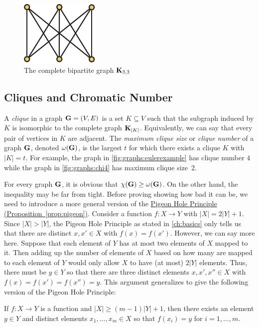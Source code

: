 \begin{figure}[h]
  \centering
  \includegraphics{graphs-figs/k33_rotated}
  \caption{The complete bipartite graph $\mathbf{K}_{3,3}$}
  \label{fig:graphs:k33}
\end{figure}

\subsection{Cliques and Chromatic Number}

A \textit{clique} in a graph $\mathbf{G}=(V,E)$ is a set $K\subseteq V$ such that
the subgraph induced by $K$ is isomorphic to the complete graph
$\mathbf{K}_{|K|}$. Equivalently, we can say that every pair of vertices in
$K$ are adjacent. The \textit{maximum clique size} or \textit{clique
  number} of a graph $\mathbf{G}$, denoted $\omega(\mathbf{G})$, is the largest
$t$ for which there exists a clique $K$ with $|K|=t$.  For example,
the graph in \autoref{fig:graphs:eulerexample} has clique number $4$
while the graph in \autoref{fig:graphs:chi4} has maximum clique
size~$2$.

For every graph $\mathbf{G}$, it is obvious that $\chi(\mathbf{G})\ge
\omega(\mathbf{G})$.  On the other hand, the inequality may be far from
tight. Before proving showing how bad it can be, we need to introduce
a more general version of the
\hyperref[prop:pigeon]{Pigeon Hole Principle
  (Proposition~\ref*{prop:pigeon})}. Consider a function $f\colon X\to
Y$ with $|X| = 2|Y|+1$. Since $|X|>|Y|$, the Pigeon Hole Principle
as stated in \autoref{ch:basics} only tells us that there are distinct
$x,x'\in X$ with $f(x)=f(x')$. However, we can say more here. Suppose
that each element of $Y$ has at most two elements of $X$ mapped to
it. Then adding up the number of elements of $X$ based on how many are
mapped to each element of $Y$ would only allow $X$ to have (at most)
$2|Y|$ elements. Thus, there must be $y\in Y$ so that there are three
distinct elements $x,x',x''\in X$ with $f(x)=f(x')=f(x'')=y$. This
argument generalizes to give the following version of the Pigeon Hole
Principle:

\begin{proposition}\label{prop:graphs:pigeon-general}
  If $f\colon X\to Y$ is a function and $|X|\geq (m-1)|Y|+1$, then
  there exists an element $y\in Y$ and distinct elements
  $x_1,\dots,x_m \in X$ so that $f(x_i)=y$ for $i=1,\dots,m$.
\end{proposition}

